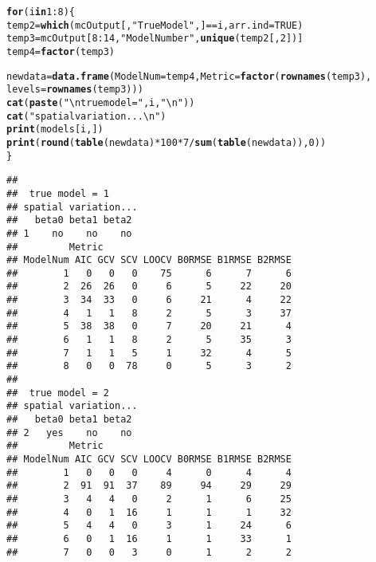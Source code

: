 \documentclass{article}\usepackage[]{graphicx}\usepackage[]{color}
\makeatletter
\newcommand{\hlnum}[1]{\textcolor[rgb]{0.686,0.059,0.569}{#1}}%
\newcommand{\hlstr}[1]{\textcolor[rgb]{0.192,0.494,0.8}{#1}}%
\newcommand{\hlopt}[1]{\textcolor[rgb]{0,0,0}{#1}}%
\newcommand{\hlstd}[1]{\textcolor[rgb]{0.345,0.345,0.345}{#1}}%
\newcommand{\hlkwa}[1]{\textcolor[rgb]{0.161,0.373,0.58}{\textbf{#1}}}%
\newcommand{\hlkwb}[1]{\textcolor[rgb]{0.69,0.353,0.396}{#1}}%
\newcommand{\hlkwc}[1]{\textcolor[rgb]{0.333,0.667,0.333}{#1}}%
\newcommand{\hlkwd}[1]{\textcolor[rgb]{0.737,0.353,0.396}{\textbf{#1}}}%
\newenvironment{kframe}{%
 \def\at@end@of@kframe{}%
 \ifinner\ifhmode%
  \def\at@end@of@kframe{\end{minipage}}%
  \begin{minipage}{\columnwidth}%
 \fi\fi%
 \def\FrameCommand##1{\hskip\@totalleftmargin \hskip-\fboxsep
 \colorbox{shadecolor}{##1}\hskip-\fboxsep
     \hskip-\linewidth \hskip-\@totalleftmargin \hskip\columnwidth}%
 \MakeFramed {\advance\hsize-\width
   \@totalleftmargin\z@ \linewidth\hsize
   \@setminipage}}%
 {\par\unskip\endMakeFramed%
 \at@end@of@kframe}
\newenvironment{knitrout}{}{} %
\makeatother
\begin{document}
\begin{knitrout}
\color{fgcolor}\begin{kframe}
\begin{alltt}
\hlkwa{for} \hlstd{(i} \hlkwa{in} \hlnum{1}\hlopt{:}\hlnum{8}\hlstd{) \{}
    \hlstd{temp2} \hlkwb{=} \hlkwd{which}\hlstd{(mcOutput[,} \hlstr{"True Model"}\hlstd{, ]} \hlopt{==} \hlstd{i,} \hlkwc{arr.ind} \hlstd{=} \hlnum{TRUE}\hlstd{)}
    \hlstd{temp3} \hlkwb{=} \hlstd{mcOutput[}\hlnum{8}\hlopt{:}\hlnum{14}\hlstd{,} \hlstr{"Model Number"}\hlstd{,} \hlkwd{unique}\hlstd{(temp2[,} \hlnum{2}\hlstd{])]}
    \hlstd{temp4} \hlkwb{=} \hlkwd{factor}\hlstd{(temp3)}

    \hlstd{newdata} \hlkwb{=} \hlkwd{data.frame}\hlstd{(}\hlkwc{ModelNum} \hlstd{= temp4,} \hlkwc{Metric} \hlstd{=} \hlkwd{factor}\hlstd{(}\hlkwd{rownames}\hlstd{(temp3),}
        \hlkwc{levels} \hlstd{=} \hlkwd{rownames}\hlstd{(temp3)))}
    \hlkwd{cat}\hlstd{(}\hlkwd{paste}\hlstd{(}\hlstr{"\textbackslash{}n true model ="}\hlstd{, i,} \hlstr{"\textbackslash{}n"}\hlstd{))}
    \hlkwd{cat}\hlstd{(}\hlstr{"spatial variation...\textbackslash{}n"}\hlstd{)}
    \hlkwd{print}\hlstd{(models[i, ])}
    \hlkwd{print}\hlstd{(}\hlkwd{round}\hlstd{(}\hlkwd{table}\hlstd{(newdata)} \hlopt{*} \hlnum{100} \hlopt{*} \hlnum{7}\hlopt{/}\hlkwd{sum}\hlstd{(}\hlkwd{table}\hlstd{(newdata)),} \hlnum{0}\hlstd{))}
\hlstd{\}}
\end{alltt}
\begin{verbatim}
## 
##  true model = 1 
## spatial variation...
##   beta0 beta1 beta2
## 1    no    no    no
##         Metric
## ModelNum AIC GCV SCV LOOCV B0RMSE B1RMSE B2RMSE
##        1   0   0   0    75      6      7      6
##        2  26  26   0     6      5     22     20
##        3  34  33   0     6     21      4     22
##        4   1   1   8     2      5      3     37
##        5  38  38   0     7     20     21      4
##        6   1   1   8     2      5     35      3
##        7   1   1   5     1     32      4      5
##        8   0   0  78     0      5      3      2
## 
##  true model = 2 
## spatial variation...
##   beta0 beta1 beta2
## 2   yes    no    no
##         Metric
## ModelNum AIC GCV SCV LOOCV B0RMSE B1RMSE B2RMSE
##        1   0   0   0     4      0      4      4
##        2  91  91  37    89     94     29     29
##        3   4   4   0     2      1      6     25
##        4   0   1  16     1      1      1     32
##        5   4   4   0     3      1     24      6
##        6   0   1  16     1      1     33      1
##        7   0   0   3     0      1      2      2

\end{verbatim}
\end{kframe}
\end{knitrout}
\end{document}
